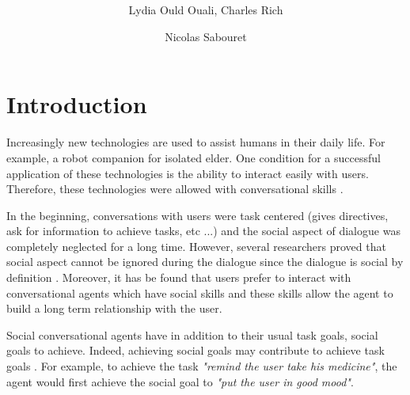\documentclass{llncs}
\begin{document}
\title{  \vskip -10pt}

\author{Lydia Ould Ouali, Charles Rich \and
Nicolas Sabouret }

\maketitle 
\begin{abstract}\vskip -20pt
  
\end{abstract}

\section{Introduction}
Increasingly new technologies are used to assist humans in their daily life. For example, a robot companion for isolated elder. One condition for a successful application of these technologies is the ability to  interact easily with users. Therefore, these technologies were allowed with conversational skills \cite{sidner2013always}. 
\par In the beginning, conversations with users were task centered (gives directives, ask for information to achieve tasks, etc ...) and the social aspect of dialogue was completely neglected for a long time. However, several researchers proved that social aspect cannot be ignored during the dialogue since the dialogue is social by definition \cite{markopoulos2005case}. Moreover, it has be found that users prefer to interact with  conversational agents which have  social skills \cite{moon1998intimate} and these skills allow the agent to build a long term relationship with the user\cite{bickmore2005establishing}. 
\par Social conversational agents have in addition to their usual task goals, social goals to achieve. Indeed, achieving social goals may contribute to achieve task goals \cite{bickmore2000weather}. For example, to achieve the task \textit{"remind the user take his medicine"}, the agent would first achieve the social goal to \textit{"put the user in good mood"}.
\end{document}
